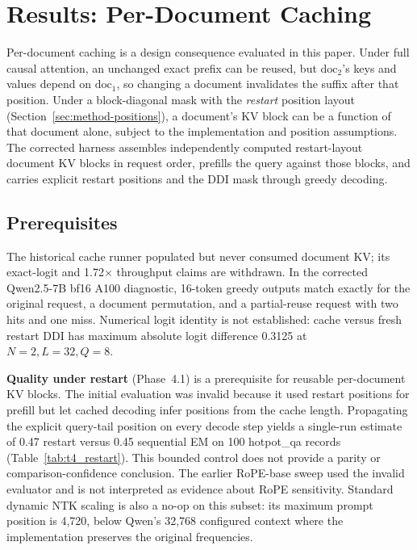 \section{Results: Per-Document Caching}
\label{sec:results-caching}

Per-document caching is a design consequence evaluated in this paper.
Under full causal attention, an unchanged exact prefix can be reused, but
$\mathrm{doc}_2$'s keys and values depend on $\mathrm{doc}_1$, so changing a
document invalidates the suffix after that position. Under a
block-diagonal mask with the \emph{restart} position layout
(Section~\ref{sec:method-positions}), a document's KV block can be a function
of that document alone, subject to the implementation and position assumptions.
The corrected harness assembles independently computed restart-layout document
KV blocks in request order, prefills the query against those blocks, and carries
explicit restart positions and the DDI mask through greedy decoding.

\subsection{Prerequisites}
\label{sec:results-caching-prereq}

The historical cache runner populated but never consumed document KV; its
exact-logit and 1.72$\times$ throughput claims are withdrawn. In the corrected
Qwen2.5-7B bf16 A100 diagnostic, 16-token greedy outputs match exactly for the
original request, a document permutation, and a partial-reuse request with two
hits and one miss. Numerical logit identity is not established: cache versus
fresh restart DDI has maximum absolute logit difference 0.3125 at
$N=2,L=32,Q=8$.

\textbf{Quality under restart} (Phase~4.1) is a prerequisite for reusable
per-document KV blocks. The initial evaluation was invalid because it used
restart positions for prefill but let cached decoding infer positions from the
cache length. Propagating the explicit query-tail position on every decode
step yields a single-run estimate of 0.47 restart versus 0.45 sequential EM
on 100 hotpot\_qa records (Table~\ref{tab:t4_restart}). This bounded control
does not provide a parity or comparison-confidence conclusion. The
earlier RoPE-base sweep used the invalid evaluator and is not interpreted as
evidence about RoPE sensitivity. Standard dynamic NTK scaling is also a no-op
on this subset: its maximum prompt position is 4,720, below Qwen's 32,768
configured context where the implementation preserves the original
frequencies.

